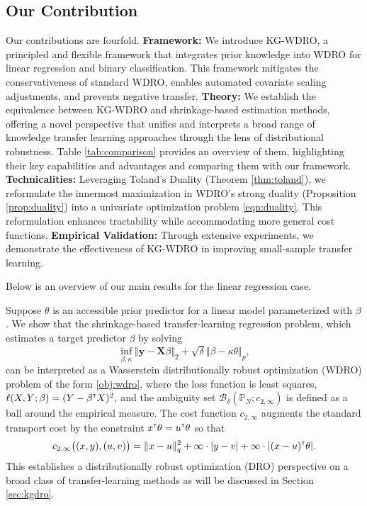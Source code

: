 \documentclass[12pt]{article}
\begin{document}
\subsection{Our Contribution}
Our contributions are fourfold. \textbf{Framework:} We introduce KG-WDRO, a principled and flexible framework that integrates prior knowledge into WDRO for linear regression and binary classification. This framework mitigates the conservativeness of standard WDRO, enables automated covariate scaling adjustments, and prevents negative transfer. \textbf{Theory:} We establish the equivalence between KG-WDRO and shrinkage-based estimation methods, offering a novel perspective that unifies and interprets a broad range of knowledge transfer learning approaches through the lens of distributional robustness. Table \ref{tab:comparison} provides an overview of them, highlighting their key capabilities and advantages and comparing them with our framework. \textbf{Technicalities:} Leveraging Toland's Duality (Theorem \ref{thm:toland}), we reformulate the innermost maximization in WDRO's strong duality (Proposition \ref{prop:duality}) into a univariate optimization problem \eqref{eqn:duality}. This reformulation enhances tractability while accommodating more general cost functions. \textbf{Empirical Validation:} Through extensive experiments, we demonstrate the effectiveness of KG-WDRO in improving small-sample transfer learning.

Below is an overview of our main results for the linear regression case.
\begin{example}
Suppose \(\theta\) is an accessible prior predictor for a linear model parameterized with $\beta$. We show that the shrinkage-based transfer-learning regression problem, which estimates a target predictor \(\beta\) by solving  
\[
\inf_{\beta,\kappa} \Vert \mathbf{y} - \mathbf{X}\beta\Vert_2 + \sqrt{\delta} \Vert \beta - \kappa \theta \Vert_p,
\]
can be interpreted as a Wasserstein distributionally robust optimization (WDRO) problem of the form \eqref{obj:wdro}, where the loss function is least squares,
$\ell(X, Y; \beta) = (Y - \beta^{\scriptscriptstyle \sf T} X)^2,$ and the ambiguity set \(\mathcal{B}_{\delta}(\mathbb{P}_N; c_{2,\infty})\) is defined as a ball around the empirical measure. The cost function \(c_{2,\infty}\) augments the standard transport cost by the constraint \(x^{\scriptscriptstyle \sf T} \theta = u^{\scriptscriptstyle \sf T} \theta\) so that
\begin{align*}
    c_{2,\infty}\big((x, y), (u, v)\big) 
   =  \Vert x - u \Vert_q^2 + \infty \cdot |y - v| + \infty \cdot |(x-u)^{\scriptscriptstyle \sf T}\theta|.
\end{align*}
This establishes a distributionally robust optimization (DRO) perspective on a broad class of transfer-learning methods as will be discussed in Section \ref{sec:kgdro}.  
\end{example}
\end{document}
